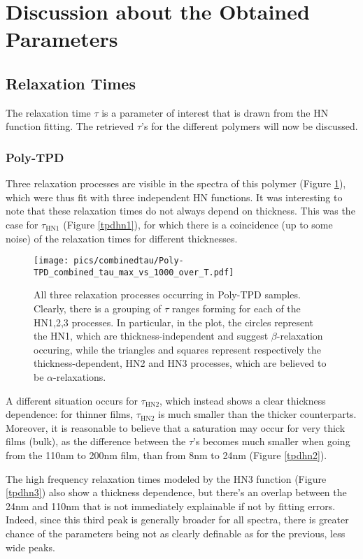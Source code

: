 \section{Discussion about the Obtained Parameters}
\subsection{Relaxation Times}
The relaxation time $\tau$ is a parameter of interest that is drawn from the HN function fitting. The retrieved $\tau$'s for the different polymers will now be discussed.
\subsubsection{Poly-TPD}
Three relaxation processes are visible in the spectra of this polymer (Figure \ref{alltau}), which were thus fit with three independent HN functions. It was interesting to note that these relaxation times do not always depend on thickness.
This was the case for $\tau_{\text{HN1}}$ (Figure \ref{tpdhn1}), for which there is a coincidence (up to some noise) of the relaxation times for different thicknesses.

\begin{figure}[!htb]%
  \centering
  \texttt{[image: pics/combinedtau/Poly-TPD\_combined\_tau\_max\_vs\_1000\_over\_T.pdf]}
  \caption{All three relaxation processes occurring in Poly-TPD samples. Clearly, there is a grouping of $\tau$ ranges forming for each of the HN1,2,3 processes. In particular, in the plot, the circles represent the HN1, which are thickness-independent and suggest $\beta$-relaxation occuring, while the triangles and squares represent respectively the thickness-dependent, HN2 and HN3 processes, which are believed to be $\alpha$-relaxations. }
  \label{alltau}
\end{figure}%



A different situation occurs for $\tau_{\text{HN2}}$, which instead shows a clear thickness dependence: for thinner films, $\tau_{\text{HN2}}$ is much smaller than the thicker counterparts. Moreover, it is reasonable to believe that a saturation may occur for very thick films (bulk), as the difference between the $\tau$'s becomes much smaller when going from the 110nm to 200nm film, than from 8nm to 24nm (Figure \ref{tpdhn2}).

The high frequency relaxation times modeled by the HN3 function (Figure \ref{tpdhn3}) also show a thickness dependence, but there's an overlap between the 24nm and 110nm that is not immediately explainable if not by fitting errors. Indeed, since this third peak is generally broader for all spectra, there is greater chance of the parameters being not as clearly definable as for the previous, less wide peaks.

